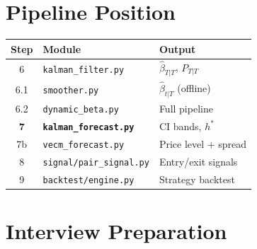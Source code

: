 \documentclass[10pt,a4paper,twocolumn]{article}
\begin{document}
\section{Pipeline Position}

\begin{center}{\small
\begin{tabular}{@{}clp{2.5cm}@{}}
\toprule Step & Module & Output\\\midrule
6 & \texttt{kalman\_filter.py} & $\hat\beta_{T|T}$, $P_{T|T}$\\
6.1 & \texttt{smoother.py} & $\hat\beta_{t|T}$ (offline)\\
6.2 & \texttt{dynamic\_beta.py} & Full pipeline\\
\textbf{7} & \textbf{\texttt{kalman\_forecast.py}} & CI bands, $h^*$\\
7b & \texttt{vecm\_forecast.py} & Price level + spread\\
8 & \texttt{signal/pair\_signal.py} & Entry/exit signals\\
9 & \texttt{backtest/engine.py} & Strategy backtest\\
\bottomrule
\end{tabular}
}\end{center}

\section{Interview Preparation}
\end{document}
